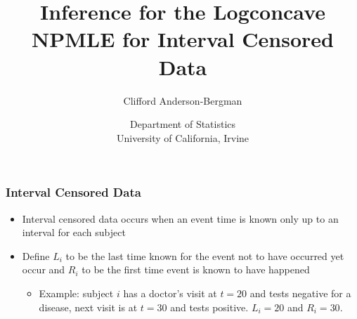 \documentclass[compress,red]{beamer}
\title{Inference for the Logconcave NPMLE for Interval Censored Data}
\author{Clifford Anderson-Bergman}
\institute{{\tiny advised by}\\ \vspace{.10cm}Professor Yaming Yu}
\date{\scriptsize Department of Statistics\\ \vspace{.10cm} University of California, Irvine \\ \space{ }}
\begin{document}
\frame{  \titlepage}


\begin{frame}

\frametitle{Interval Censored Data}

	\begin{itemize}

	\item Interval censored data occurs when an event time is known only up to an interval for each subject
	
	\item Define $L_i$ to be the last time known for the event not to have occurred yet occur and $R_i$ to be the first time event is known to have happened
	
		\begin{itemize}
		
		\item Example: subject $i$ has a doctor's visit at $t = 20$ and tests negative for a disease, next visit is at $t = 30$ and tests positive. $L_i = 20$ and $R_i = 30$.
		
		\end{itemize}

	\end{itemize}

\end{frame}
\end{document}
